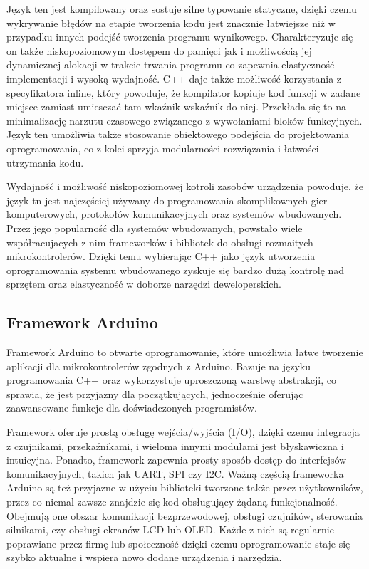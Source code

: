 \documentclass[12pt,twoside]{article}
\begin{document}
Język ten jest kompilowany oraz sostuje silne typowanie statyczne, dzięki czemu wykrywanie błędów na etapie tworzenia kodu jest znacznie łatwiejsze niż w przypadku innych podejść tworzenia programu wynikowego. Charakteryzuje się on także niskopoziomowym dostępem do pamięci jak i możliwością jej dynamicznej alokacji w trakcie trwania programu co zapewnia elastyczność implementacji i wysoką wydajność. C++ daje także możliwość korzystania z specyfikatora inline, który powoduje, że kompilator kopiuje kod funkcji w zadane miejsce zamiast umiesczać tam wkaźnik wskaźnik do niej. Przekłada się to na minimalizację narzutu czasowego związanego z wywołaniami bloków funkcyjnych. Język ten umożliwia także stosowanie obiektowego podejścia do projektowania oprogramowania, co z kolei sprzyja modularności rozwiązania i łatwości utrzymania kodu.\cite{cppBjarne}

Wydajność i możliwość niskopoziomowej kotroli zasobów urządzenia powoduje, że język tn jest  najczęściej używany do programowania skomplikownych gier
komputerowych, protokołów komunikacyjnych oraz systemów wbudowanych. Przez jego popularność dla systemów wbudowanych, powstało wiele współracujacych z nim frameworków i bibliotek do obsługi rozmaitych mikrokontrolerów. Dzięki temu wybierając C++ jako język utworzenia oprogramowania systemu wbudowanego zyskuje się bardzo dużą kontrolę nad sprzętem oraz elastyczność w doborze narzędzi deweloperskich.

\subsection{Framework Arduino}
Framework Arduino\cite{arduinoIntroduction} to otwarte oprogramowanie, które umożliwia łatwe tworzenie aplikacji dla mikrokontrolerów zgodnych z Arduino.
Bazuje na języku programowania C++ oraz wykorzystuje uproszczoną warstwę abstrakcji, co sprawia, że
jest przyjazny dla początkujących, jednocześnie oferując zaawansowane funkcje dla doświadczonych programistów.

Framework oferuje prostą obsługę wejścia/wyjścia (I/O), dzięki czemu integracja z czujnikami, przekaźnikami, i wieloma innymi modułami jest błyskawiczna i intuicyjna. Ponadto, framework zapewnia prosty sposób dostęp do interfejsów komunikacyjnych,
takich jak UART, SPI czy I2C. Ważną częścią frameworka Arduino są też przyjazne w użyciu biblioteki tworzone także przez użytkowników, przez co niemal zawsze znajdzie się kod obsługujący żądaną funkcjonalność. Obejmują one obszar komunikacji bezprzewodowej, obsługi czujników, sterowania silnikami, czy obsługi ekranów LCD lub OLED. Każde z nich są regularnie poprawiane przez firmę lub społeczność dzięki czemu oprogramowanie staje się szybko aktualne i wspiera nowo dodane urządzenia i narzędzia.
\end{document}
